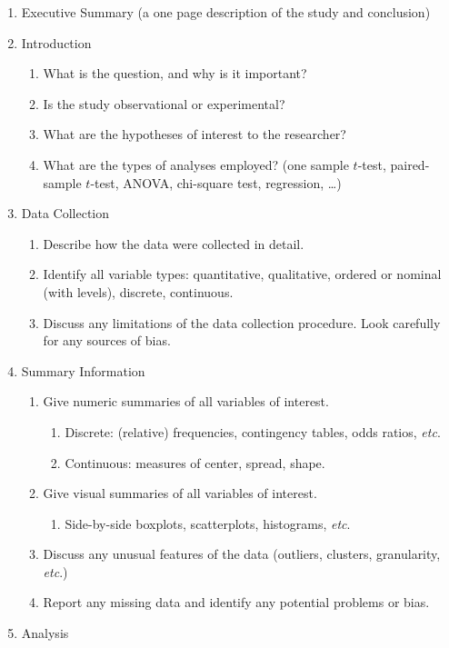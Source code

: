 \documentclass[captions=tableheading]{scrbook}
\begin{document}
\begin{enumerate}
\item Executive Summary (a one page description of the study and conclusion)
\item Introduction
\begin{enumerate}
\item What is the question, and why is it important?
\item Is the study observational or experimental?
\item What are the hypotheses of interest to the researcher?
\item What are the types of analyses employed? (one sample \(t\)-test, paired-sample \(t\)-test, ANOVA, chi-square test, regression, \ldots{})
\end{enumerate}
\item Data Collection
\begin{enumerate}
\item Describe how the data were collected in detail.
\item Identify all variable types: quantitative, qualitative, ordered or nominal (with levels), discrete, continuous.
\item Discuss any limitations of the data collection procedure. Look carefully for any sources of bias.
\end{enumerate}
\item Summary Information
\begin{enumerate}
\item Give numeric summaries of all variables of interest.
\begin{enumerate}
\item Discrete: (relative) frequencies, contingency tables, odds ratios, \emph{etc}.
\item Continuous: measures of center, spread, shape.
\end{enumerate}
\item Give visual summaries of all variables of interest.
\begin{enumerate}
\item Side-by-side boxplots, scatterplots, histograms, \emph{etc}.
\end{enumerate}
\item Discuss any unusual features of the data (outliers, clusters, granularity, \emph{etc}.)
\item Report any missing data and identify any potential problems or bias.
\end{enumerate}
\item Analysis

\end{enumerate}
\end{document}
